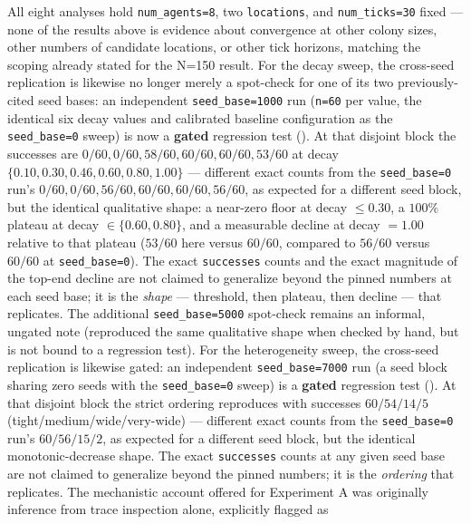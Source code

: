 \documentclass[
  english,
]{article}
\newcounter{none} %
\theoremstyle{definition}
\begin{document}
All eight analyses hold \texttt{num\_agents=8}, two \texttt{locations},
and \texttt{num\_ticks=30} fixed --- none of the results above is
evidence about convergence at other colony sizes, other numbers of
candidate locations, or other tick horizons, matching the scoping
already stated for the N=150 result. For the decay sweep, the cross-seed
replication is likewise no longer merely a spot-check for one of its two
previously-cited seed bases: an independent \texttt{seed\_base=1000} run
(\texttt{n=60} per value, the identical six decay values and calibrated
baseline configuration as the \texttt{seed\_base=0} sweep) is now a
\textbf{gated} regression test
().
At that disjoint block the successes are
\(0/60, 0/60, 58/60, 60/60, 60/60,
53/60\) at decay \(\{0.10, 0.30, 0.46, 0.60, 0.80, 1.00\}\) ---
different exact counts from the \texttt{seed\_base=0} run's
\(0/60, 0/60, 56/60, 60/60, 60/60, 56/60\), as expected for a different
seed block, but the identical qualitative shape: a near-zero floor at
decay \(\le 0.30\), a \(100\%\) plateau at decay \(\in \{0.60, 0.80\}\),
and a measurable decline at decay \(=1.00\) relative to that plateau
(\(53/60\) here versus \(60/60\), compared to \(56/60\) versus \(60/60\)
at \texttt{seed\_base=0}). The exact \texttt{successes} counts and the
exact magnitude of the top-end decline are not claimed to generalize
beyond the pinned numbers at each seed base; it is the \emph{shape} ---
threshold, then plateau, then decline --- that replicates. The
additional \texttt{seed\_base=5000} spot-check remains an informal,
ungated note (reproduced the same qualitative shape when checked by
hand, but is not bound to a regression test). For the heterogeneity
sweep, the cross-seed replication is likewise gated: an independent
\texttt{seed\_base=7000} run (a seed block sharing zero seeds with the
\texttt{seed\_base=0} sweep) is a \textbf{gated} regression test
().
At that disjoint block the strict ordering reproduces with successes
\(60/54/14/5\) (tight/medium/wide/very-wide) --- different exact counts
from the \texttt{seed\_base=0} run's \(60/56/15/2\), as expected for a
different seed block, but the identical monotonic-decrease shape. The
exact \texttt{successes} counts at any given seed base are not claimed
to generalize beyond the pinned numbers; it is the \emph{ordering} that
replicates. The mechanistic account offered for Experiment A was
originally inference from trace inspection alone, explicitly flagged as
\end{document}
